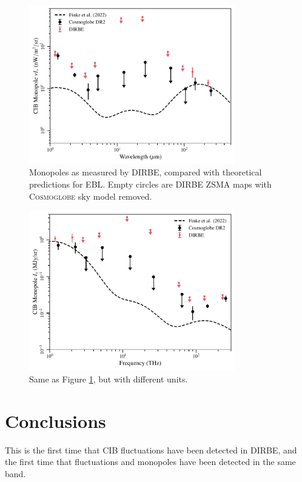 \documentclass{aa}
\begin{document}
\begin{figure}
	\centering
	\includegraphics[width=0.8\textwidth]{figs/CIB_mono.pdf}
	\caption{Monopoles as measured by DIRBE, compared with theoretical predictions for EBL. Empty circles are DIRBE ZSMA maps with \textsc{Cosmoglobe} sky model removed.}
	\label{fig: EBL_monopoles}
\end{figure}

\begin{figure}
	\centering
	\includegraphics[width=0.8\textwidth]{figs/CIB_THz.pdf}
	\caption{Same as Figure \ref{fig: EBL_monopoles}, but with different units.}
	\label{fig: EBL_monopoles_THz}
\end{figure}

\section{Conclusions}

This is the first time that CIB fluctuations have been detected in DIRBE, and the first time that fluctuations and monopoles have been detected in the same band.
\end{document}
